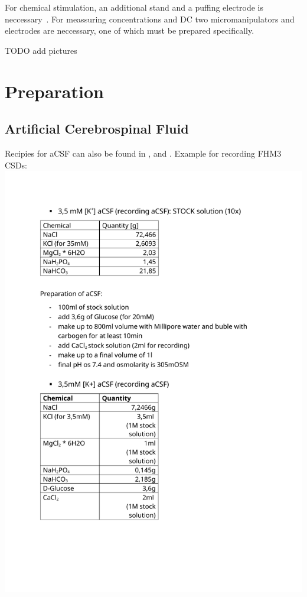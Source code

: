 \documentclass[11pt]{article}
\begin{document}
    For chemical stimulation, an additional stand and a puffing electrode is neccessary~\cite{puff-csd}.
    For meassuring concentrations and DC two micromanipulators and electrodes are neccessary, one of which must be prepared specifically.

    TODO add pictures

\section{Preparation}
    \subsection{Artificial Cerebrospinal Fluid}
        Recipies for aCSF can also be found in \cite[p. 10]{star}, \cite[p. 122]{dallas2021patch} and \cite{mcs}.
        Example for recording FHM3 CSDs: \\
        \includegraphics[keepaspectratio,width=\textwidth]{img/aCSF_3.5mM_Potassium.pdf}
\end{document}
